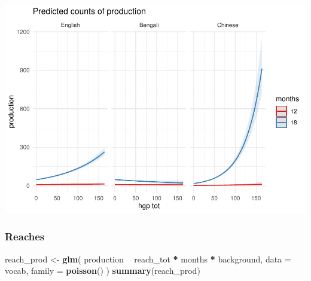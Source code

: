 \documentclass[]{article}
\newenvironment{Shaded}{\begin{snugshade}}{\end{snugshade}}
\newcommand{\DataTypeTok}[1]{\textcolor[rgb]{0.13,0.29,0.53}{#1}}
\newcommand{\KeywordTok}[1]{\textcolor[rgb]{0.13,0.29,0.53}{\textbf{#1}}}
\newcommand{\NormalTok}[1]{#1}
\newcommand{\OperatorTok}[1]{\textcolor[rgb]{0.81,0.36,0.00}{\textbf{#1}}}
\newcommand{\StringTok}[1]{\textcolor[rgb]{0.31,0.60,0.02}{#1}}
\begin{document}
\includegraphics{supplement_files/figure-latex/hgp-lm-2-undsay-plot-1.pdf}

\hypertarget{reaches-2}{%
\subsubsection{Reaches}\label{reaches-2}}

\begin{Shaded}
\begin{Highlighting}[]
\NormalTok{reach_prod <-}\StringTok{ }\KeywordTok{glm}\NormalTok{(}
\NormalTok{  production }\OperatorTok{~}
\StringTok{    }\NormalTok{reach_tot }\OperatorTok{*}
\StringTok{    }\NormalTok{months }\OperatorTok{*}
\StringTok{    }\NormalTok{background,}
  \DataTypeTok{data =}\NormalTok{ vocab,}
  \DataTypeTok{family =} \KeywordTok{poisson}\NormalTok{()}
\NormalTok{)}
\KeywordTok{summary}\NormalTok{(reach_prod)}
\end{Highlighting}
\end{Shaded}
\end{document}
